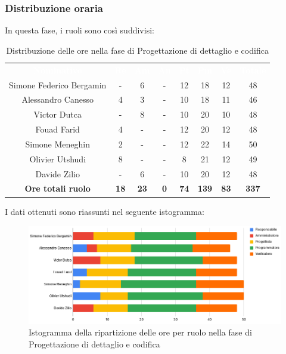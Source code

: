 \subsubsection{Distribuzione oraria}
In questa fase, i ruoli sono così suddivisi:
\begin{table}[H]
\centering\renewcommand{\arraystretch}{1.5}
\caption{Distribuzione delle ore nella fase di Progettazione di dettaglio e codifica}
\vspace{0.2cm}
\begin{tabular}{ c | c | c | c | c | c | c | c }
\rowcolor{redafk}
\textcolor{white}{\textbf{Nominativo}} & \textcolor{white}{\textbf{Re}} & 
\textcolor{white}{\textbf{Am}} & \textcolor{white}{\textbf{An}} &
\textcolor{white}{\textbf{Pt}} & \textcolor{white}{\textbf{Pm}} &
\textcolor{white}{\textbf{Ve}} & \textcolor{white}{\textbf{Totale}} \\
Simone Federico Bergamin & - & 6 & - & 12 & 18 & 12 & 48 \\
Alessandro Canesso & 4 & 3 & - & 10 & 18 & 11 & 46 \\
Victor Dutca & - & 8 & - & 10 & 20 & 10 & 48 \\
Fouad Farid	& 4 & - & - & 12 & 20 & 12 & 48 \\
Simone Meneghin & 2 & - & - & 12 & 22 & 14 & 50 \\
Olivier Utshudi & 8 & - & - & 8 & 21 & 12 & 49 \\
Davide Zilio & - & 6 & - & 10 & 20 & 12 & 48 \\
\rowcolor{lastrowcolor}
\textbf{Ore totali ruolo} & \textbf{18} & \textbf{23} & \textbf{0} & \textbf{74} & \textbf{139} & \textbf{83} & \textbf{337} \\
\end{tabular}
\end{table}

I dati ottenuti sono riassunti nel seguente istogramma:
\begin{figure}[H]
\centering
\includegraphics[scale=0.60]{img/grafici/tabella_fase_prog_cod.png}
\caption{Istogramma della ripartizione delle ore per ruolo nella fase di Progettazione di dettaglio e codifica}
\end{figure}


